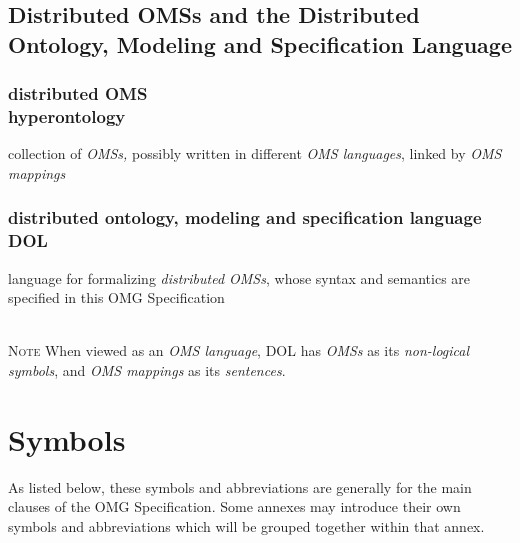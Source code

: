 \documentclass[10pt,%
\ifpretendfinal
final%
\else
draft%
\fi,
]{scrreprt}
\newcommand*{\termref}[1]{\textit{#1}}
\newcommand*{\synonym}{\\}
\newcommand*{\IS}{OMG Specification\xspace}
\newcommand{\sclause}[1]{\section{#1}}
\newcommand{\termdefinition}[2]{\subsection*{#1}#2}
\newenvironment{definitions}[0]{\medskip }{}
\newenvironment{note}[0]{\ \\ \textsc{Note} \quad}{}
\begin{document}
\sclause{Distributed OMSs and the Distributed Ontology, Modeling and Specification Language}

\begin{definitions}
  \termdefinition{distributed OMS\synonym hyperontology}{collection of \termref{OMSs,} possibly written in different \termref{OMS languages}, linked by \termref{OMS mappings}}

  \termdefinition{distributed ontology, modeling and specification language\synonym
  DOL}{language for formalizing \termref{distributed OMSs}, whose syntax and semantics are specified in this \IS}

\begin{note}
 When viewed as an \termref{OMS language}, DOL has \termref{OMSs} as its
\termref{non-logical symbols}, and \termref{OMS mappings} as its \termref{sentences}.
\end{note}
\end{definitions}

\chapter{Symbols}

As listed below, these symbols and abbreviations are generally for the main clauses of the \IS. Some annexes may introduce their own symbols and abbreviations which will be grouped together within that annex.
\end{document}
